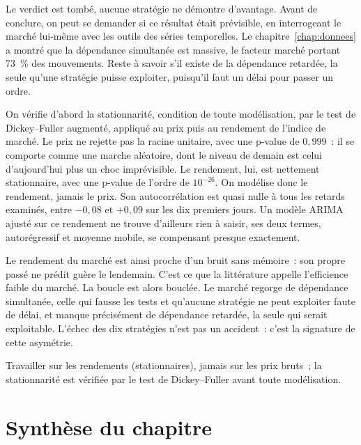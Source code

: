 Le verdict est tombé, aucune stratégie ne démontre d'avantage. Avant de
conclure, on peut se demander si ce résultat était prévisible, en
interrogeant le marché lui-même avec les outils des séries temporelles.
Le chapitre~\ref{chap:donnees} a montré que la dépendance simultanée est
massive, le facteur marché portant 73~\% des mouvements. Reste à savoir
s'il existe de la dépendance retardée, la seule qu'une stratégie puisse
exploiter, puisqu'il faut un délai pour passer un ordre.

On vérifie d'abord la stationnarité, condition de toute modélisation,
par le test de Dickey--Fuller augmenté, appliqué au prix puis au
rendement de l'indice de marché. Le prix ne rejette pas la racine
unitaire, avec une p-value de $0{,}999$~: il se comporte comme une
marche aléatoire, dont le niveau de demain est celui d'aujourd'hui plus
un choc imprévisible. Le rendement, lui, est nettement stationnaire,
avec une p-value de l'ordre de $10^{-26}$. On modélise donc le
rendement, jamais le prix. Son autocorrélation est quasi nulle à tous
les retards examinés, entre $-0{,}08$ et $+0{,}09$ sur les dix premiers
jours. Un modèle ARIMA~\cite{boxjenkins1970} ajusté sur ce rendement ne
trouve d'ailleurs rien à saisir, ses deux termes, autorégressif et
moyenne mobile, se compensant presque exactement.

Le rendement du marché est ainsi proche d'un bruit sans mémoire~: son
propre passé ne prédit guère le lendemain. C'est ce que la littérature
appelle l'efficience faible du marché. La boucle est alors bouclée. Le
marché regorge de dépendance simultanée, celle qui fausse les tests et
qu'aucune stratégie ne peut exploiter faute de délai, et manque
précisément de dépendance retardée, la seule qui serait exploitable.
L'échec des dix stratégies n'est pas un accident~: c'est la signature de
cette asymétrie.

\begin{conditions}
Travailler sur les rendements (stationnaires), jamais sur les prix
bruts~; la stationnarité est vérifiée par le test de Dickey--Fuller
avant toute modélisation.
\end{conditions}

\section{Synthèse du chapitre}
\label{sec:b1-synthese}


